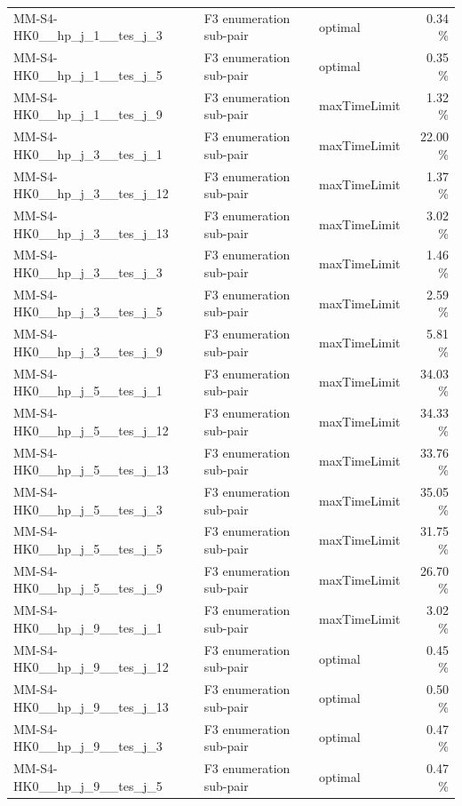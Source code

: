\begin{table}[htbp]
\begin{tabular}{lllr}
  MM-S4-HK0\_\_hp\_j\_1\_\_tes\_j\_3 & F3 enumeration sub-pair & optimal & 0.34 \% \\
  MM-S4-HK0\_\_hp\_j\_1\_\_tes\_j\_5 & F3 enumeration sub-pair & optimal & 0.35 \% \\
  MM-S4-HK0\_\_hp\_j\_1\_\_tes\_j\_9 & F3 enumeration sub-pair & maxTimeLimit & 1.32 \% \\
  MM-S4-HK0\_\_hp\_j\_3\_\_tes\_j\_1 & F3 enumeration sub-pair & maxTimeLimit & 22.00 \% \\
  MM-S4-HK0\_\_hp\_j\_3\_\_tes\_j\_12 & F3 enumeration sub-pair & maxTimeLimit & 1.37 \% \\
  MM-S4-HK0\_\_hp\_j\_3\_\_tes\_j\_13 & F3 enumeration sub-pair & maxTimeLimit & 3.02 \% \\
  MM-S4-HK0\_\_hp\_j\_3\_\_tes\_j\_3 & F3 enumeration sub-pair & maxTimeLimit & 1.46 \% \\
  MM-S4-HK0\_\_hp\_j\_3\_\_tes\_j\_5 & F3 enumeration sub-pair & maxTimeLimit & 2.59 \% \\
  MM-S4-HK0\_\_hp\_j\_3\_\_tes\_j\_9 & F3 enumeration sub-pair & maxTimeLimit & 5.81 \% \\
  MM-S4-HK0\_\_hp\_j\_5\_\_tes\_j\_1 & F3 enumeration sub-pair & maxTimeLimit & 34.03 \% \\
  MM-S4-HK0\_\_hp\_j\_5\_\_tes\_j\_12 & F3 enumeration sub-pair & maxTimeLimit & 34.33 \% \\
  MM-S4-HK0\_\_hp\_j\_5\_\_tes\_j\_13 & F3 enumeration sub-pair & maxTimeLimit & 33.76 \% \\
  MM-S4-HK0\_\_hp\_j\_5\_\_tes\_j\_3 & F3 enumeration sub-pair & maxTimeLimit & 35.05 \% \\
  MM-S4-HK0\_\_hp\_j\_5\_\_tes\_j\_5 & F3 enumeration sub-pair & maxTimeLimit & 31.75 \% \\
  MM-S4-HK0\_\_hp\_j\_5\_\_tes\_j\_9 & F3 enumeration sub-pair & maxTimeLimit & 26.70 \% \\
  MM-S4-HK0\_\_hp\_j\_9\_\_tes\_j\_1 & F3 enumeration sub-pair & maxTimeLimit & 3.02 \% \\
  MM-S4-HK0\_\_hp\_j\_9\_\_tes\_j\_12 & F3 enumeration sub-pair & optimal & 0.45 \% \\
  MM-S4-HK0\_\_hp\_j\_9\_\_tes\_j\_13 & F3 enumeration sub-pair & optimal & 0.50 \% \\
  MM-S4-HK0\_\_hp\_j\_9\_\_tes\_j\_3 & F3 enumeration sub-pair & optimal & 0.47 \% \\
  MM-S4-HK0\_\_hp\_j\_9\_\_tes\_j\_5 & F3 enumeration sub-pair & optimal & 0.47 \% \\

\end{tabular}
\end{table}
